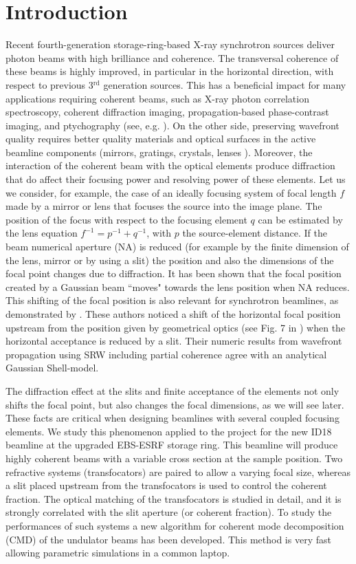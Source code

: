 \documentclass{iucr}              %
\begin{document}
\section{Introduction}
\label{sec:introduction}


Recent fourth-generation storage-ring-based X-ray synchrotron sources deliver photon beams with high brilliance and coherence. The transversal coherence of these beams is highly improved, in particular in the horizontal direction, with respect to previous 3$^{\text{rd}}$ generation sources. This has a beneficial impact for many applications requiring coherent beams, such as X-ray photon correlation spectroscopy, coherent diffraction imaging, propagation-based phase-contrast imaging, and ptychography (see, e.g. \cite{paganin_book}). On the other side, preserving wavefront quality requires better quality materials and optical surfaces in the active beamline components (mirrors, gratings, crystals, lenses \cite{Yabashi}). Moreover, the interaction of the coherent beam with the optical elements produce diffraction that do affect their focusing power and resolving power of these elements. Let us we consider, for example, the case of an ideally focusing system of focal length $f$ made by a mirror or lens that focuses the source into the image plane. The position of the focus with respect to the focusing element $q$ can be estimated by the lens equation $f^{-1}=p^{-1}+q^{-1}$, with $p$ the source-element distance. If the beam numerical aperture (NA) is reduced (for example by the finite dimension of the lens, mirror or by using a slit) the position and also the dimensions of the focal point changes due to diffraction. It has been shown \cite{Tanaka:85} that the focal position created by a Gaussian beam ``moves" towards the lens position when NA reduces. This shifting of the focal position is also relevant for synchrotron beamlines, as demonstrated by \cite{westfahl}. These authors noticed a shift of the horizontal focal position upstream from the position given by geometrical optics (see Fig. 7 in \cite{westfahl}) when the horizontal acceptance is reduced by a slit. Their numeric results from wavefront propagation using SRW \cite{codeSRW} including partial coherence agree with an analytical Gaussian Shell-model.

The diffraction effect at the slits and finite acceptance of the elements not only shifts the focal point, but also changes the focal dimensions, as we will see later. These facts are critical when designing beamlines with several coupled focusing elements. We study this phenomenon applied to the project for the new ID18 beamline at the upgraded EBS-ESRF storage ring. This beamline will produce highly coherent beams with a variable cross section at the sample position. Two refractive systems (transfocators) are paired to allow a varying focal size, whereas a slit placed upstream from the transfocators is used to control the coherent fraction. The optical matching of the transfocators is studied in detail, and it is strongly correlated with the slit aperture (or coherent fraction). To study the performances of such systems a new algorithm for coherent mode decomposition (CMD) of the undulator beams has been developed. This method is very fast allowing parametric simulations in a common laptop.
\end{document}
